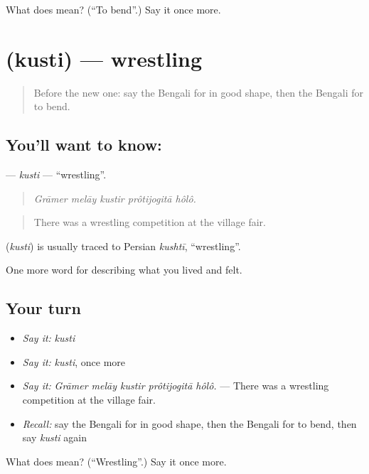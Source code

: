 \begin{tcolorbox}[breakable,colback=teal!4,colframe=teal!35!black,title={Before you move on}]
What does  mean? (\textquotedblleft{}To bend\textquotedblright{}.) Say it once more.
\end{tcolorbox}
\section[\texorpdfstring{\bn{কুস্তি} (kusti)}{কুস্তি (kusti)}]{ (kusti) — wrestling}

\label{lesson:BN-C522-kusti}



\begin{quote}
Before the new one: say the Bengali for in good shape, then the Bengali for to bend.
\end{quote}

\subsection*{You'll want to know: }
\textbf{} — \emph{kusti} — \textquotedblleft{}wrestling\textquotedblright{}.

\begin{quote}
    
\end{quote}

\begin{quote}
\emph{Grāmer melāy kustir prôtijogitā hôlô.}
\end{quote}

\begin{quote}
There was a wrestling competition at the village fair.
\end{quote}

\begin{cousinweb}
\textbf{} (\emph{kusti}) is usually traced to Persian \emph{kushtī}, \textquotedblleft{}wrestling\textquotedblright{}.
\end{cousinweb}

\begin{grammarlens}[title={What you've built}]
One more word for describing what you lived and felt.
\end{grammarlens}

\subsection*{Your turn}
\begin{itemize}
\raggedright
  \item \emph{Say it:} \emph{kusti}
  \item \emph{Say it:} \emph{kusti}, once more
  \item \emph{Say it:} \emph{Grāmer melāy kustir prôtijogitā hôlô.} — There was a wrestling competition at the village fair.
  \item \emph{Recall:} say the Bengali for in good shape, then the Bengali for to bend, then say \emph{kusti} again
\end{itemize}

\begin{tcolorbox}[breakable,colback=teal!4,colframe=teal!35!black,title={Before you move on}]
What does  mean? (\textquotedblleft{}Wrestling\textquotedblright{}.) Say it once more.
\end{tcolorbox}
